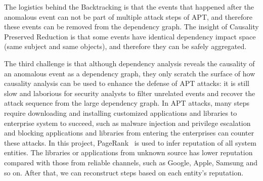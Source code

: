 The logistics behind the Backtracking is that the events that happened after the anomalous event can not be part of multiple attack steps of APT, and therefore these events can be removed from the dependency graph. The insight of Causality Preserved Reduction is that some events have identical dependency impact space (same subject and same objects), and therefore they can be safely aggregated.

The third challenge is that although dependency analysis reveals the causality of an anomalous event as a dependency graph, they only scratch the surface of how causality analysis can be used to enhance the defense of APT attacks: it is still slow and laborious for security analysts to filter unrelated events and recover the attack sequence from the large dependency graph. In APT attacks, many steps require downloading and installing customized applications and libraries to enterprise system to succeed, such as malware injection and privilege escalation~\cite{apt,aptmalware,defendapt} and blocking applications and libraries from entering the enterprises can counter these attacks. 
In this project, PageRank~\cite{pagerank} is used to infer reputation of all system entities. The libraries or applications from unknown source has lower reputation compared with those from reliable channels, such as Google, Apple, Samsung and so on. After that, we can reconstruct steps based on each entity's reputation.